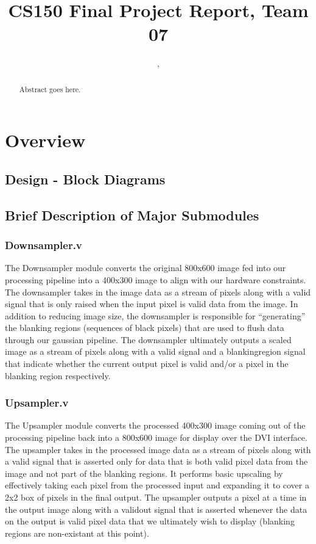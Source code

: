 \documentclass[11pt]{article}
\title{CS150 Final Project Report, Team 07}
\author{\Name, \texttt{\Login}}
\begin{document}
\maketitle



\begin{abstract}

Abstract goes here.

\end{abstract}

\newpage

\section{Overview}

\subsection{Design - Block Diagrams}

\subsection{Brief Description of Major Submodules}

\subsubsection{Downsampler.v}
The Downsampler module converts the original 800x600 image fed into our processing
pipeline into a 400x300 image to align with our hardware constraints. The downsampler
takes in the image data as a stream of pixels along with a valid signal that is
only raised when the input pixel is valid data from the image. In addition to 
reducing image size, the downsampler is responsible for ``generating'' the 
blanking regions (sequences of black pixels) that are used to flush data 
through our gaussian pipeline. The downsampler ultimately outputs a scaled 
image as a stream of pixels along with a valid signal and a blankingregion 
signal that indicate whether the current output pixel is valid and/or a pixel
in the blanking region respectively.

\subsubsection{Upsampler.v}
The Upsampler module converts the processed 400x300 image coming out of the processing
pipeline back into a 800x600 image for display over the DVI interface. The upsampler
takes in the processed image data as a stream of pixels along with a valid signal 
that is asserted only for data that is both valid pixel data from the image and
not part of the blanking regions. It performs basic upscaling by effectively taking
each pixel from the processed input and expanding it to cover a 2x2 box of 
pixels in the final output. The upsampler outputs a pixel at a time in the output 
image along with a validout signal that is asserted whenever the data on the 
output is valid pixel data that we ultimately wish to display (blanking regions
are non-existant at this point).
\end{document}
